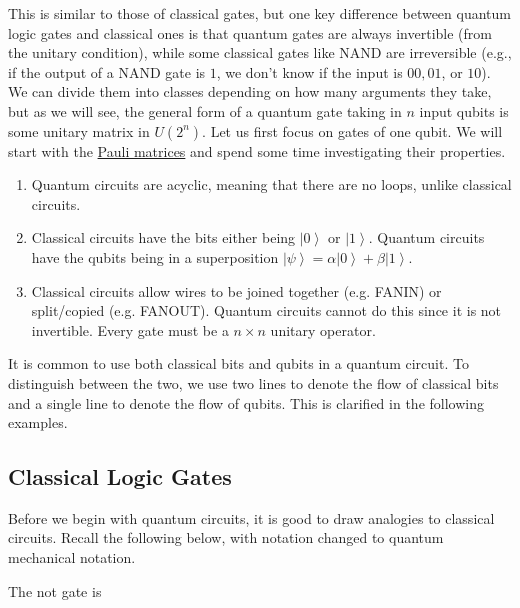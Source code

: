 \documentclass{article}
\newcommand{\ket}[1]{\ensuremath{\left|#1\right\rangle}}
\newcounter{definition}[section]
\newcounter{example}[section]
\begin{document}
    This is similar to those of classical gates, but one key difference between quantum logic gates and classical ones is that quantum gates are always invertible (from the unitary condition), while some classical gates like NAND are irreversible (e.g., if the output of a NAND gate is $1$, we don't know if the input is $00, 01$, or $10$). We can divide them into classes depending on how many arguments they take, but as we will see, the general form of a quantum gate taking in $n$ input qubits is some unitary matrix in $U(2^n)$. Let us first focus on gates of one qubit. We will start with the \hyperref[dg-def:pauli-matrices]{Pauli matrices} and spend some time investigating their properties.  

    \begin{enumerate} 
      \item Quantum circuits are acyclic, meaning that there are no loops, unlike classical circuits. 
      \item Classical circuits have the bits either being $\ket{0}$ or $\ket{1}$. Quantum circuits have the qubits being in a superposition $\ket{\psi} = \alpha \ket{0} + \beta \ket{1}$. 
      \item Classical circuits allow wires to be joined together (e.g. FANIN) or split/copied (e.g. FANOUT). Quantum circuits cannot do this since it is not invertible. Every gate must be a $n \times n$ unitary operator.
    \end{enumerate}
    
    It is common to use both classical bits and qubits in a quantum circuit. To distinguish between the two, we use two lines to denote the flow of classical bits and a single line to denote the flow of qubits. This is clarified in the following examples. 

  \subsection{Classical Logic Gates} 

    Before we begin with quantum circuits, it is good to draw analogies to classical circuits. Recall the following below, with notation changed to quantum mechanical notation. 

    \begin{definition}
      \label{def:classical-not}
      The not gate is 
    \end{definition}
\end{document}
